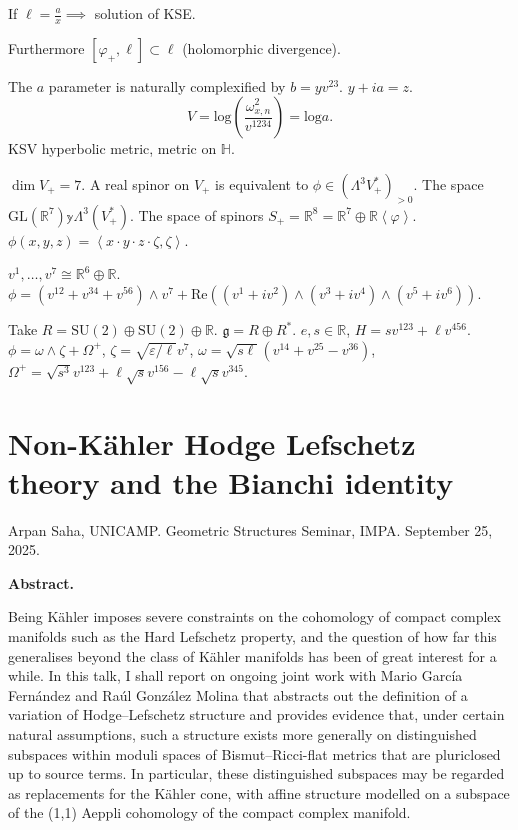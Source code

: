 {\begin{exercise}
\label{exercise-solution-of-KSE}
If $\ell=\frac{a}{x} \implies $ solution of KSE.
\end{exercise}

Furthermore $[\varphi_+,\ell] \subset \ell$
(holomorphic divergence).

The $a$ parameter is naturally complexified by  $b=yv^{23}$.
$y+ia=z$. 
$$
V=\text{log} \left(\frac{\omega^2_{x,n}}{v^{1234}}\right)=\text{log}a.
$$
KSV hyperbolic metric, metric on $\mathbb{H}$.

\medskip\noindent
{\bf $\dim V_+=7$}.
A real spinor on $V_+$ is equivalent to $\phi \in (\Lambda^{3}V_+^* )_{>0}$.
The space $\text{GL}(\mathbb{R}^7)\mathbb{y}\Lambda^{3}(V_+^*)$.
The space of spinors $S_+=\mathbb{R}^8
=\mathbb{R}^7\oplus\mathbb{R}\left<\varphi\right>$.
$\phi(x,y,z)=\left<x\cdot y\cdot z\cdot \zeta,\zeta\right>$.

\begin{remark}
\label{remark-7}
$v^1,\ldots,v^7 \cong \mathbb{R}^6 \oplus \mathbb{R}$.
$\phi=(v^{12}+v^{34}+v^{56})\wedge v^7+
\text{Re}((v^1+i v^2)\wedge(v^3+iv^4)\wedge(v^5+iv^6))$.
\end{remark}

\begin{example}
\label{example-SU2+SU2+R}
Take $R=\text{SU}(2)\oplus \text{SU}(2)\oplus \mathbb{R}$.
$\mathfrak{g}=R \oplus R^*$.
$e,s \in \mathbb{R}$, $H=sv^{123}+\ell v^{456}$.
$\phi=\omega \wedge \zeta+\Omega^+$,
$\zeta=\sqrt{\varepsilon/\ell}v^7$,
$\omega=\sqrt{s\ell}(v^{14}+v^{25}-v^{36})$,
$\Omega^+=\sqrt{s^3}v^{123}+\ell \sqrt{s}v^{156}-\ell \sqrt{s}v^{345}$.
\end{example}

\section{Non-Kähler Hodge Lefschetz theory
and the Bianchi identity}
\label{section-non-kahler-hodge-lefschetz-theory-and-bianchi-identity}

\noindent
Arpan Saha, UNICAMP.
Geometric Structures Seminar, IMPA. 
September 25, 2025.

\medskip
{\bf Abstract.} 

Being Kähler imposes severe constraints on the cohomology of compact complex
manifolds such as the Hard Lefschetz property, and the question of how far this
generalises beyond the class of Kähler manifolds has been of great interest for
a while. In this talk, I shall report on ongoing joint work with Mario García
Fernández and Raúl González Molina that abstracts out the definition of a
variation of Hodge--Lefschetz structure and provides evidence that, under
certain natural assumptions, such a structure exists more generally on
distinguished subspaces within moduli spaces of Bismut--Ricci-flat metrics that
are pluriclosed up to source terms. In particular, these distinguished subspaces
may be regarded as replacements for the Kähler cone, with affine structure
modelled on a subspace of the (1,1) Aeppli cohomology of the compact complex
manifold.

}
